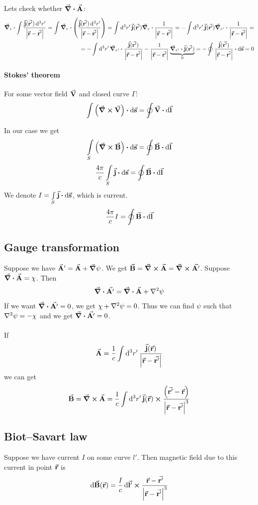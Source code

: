 Lets check whether $\div{\va{A}}$:
\begin{align*}
\grad_r \vdot {\int \frac{\va{j} (\va{r'}) \dd[3]{r'}}{\qty|\va{r} -\va{r'}|}} =  \int \grad_r \vdot \qty(\frac{\va{j} (\va{r'}) \dd[3]{r'}}{\qty|\va{r} -\va{r'}|})  = \int \dd[3]{r'}  \va{j} (\va{r'}) \grad_{r} \vdot \frac{1 }{\qty|\va{r} -\va{r'}|} = -\int \dd[3]{r'}  \va{j} (\va{r'}) \grad_{r'} \vdot \frac{1 }{\qty|\va{r} -\va{r'}|} =\\= -\int \dd[3]{r'}  \grad_{r'} \vdot \frac{\va{j} (\va{r'})  }{\qty|\va{r} -\va{r'}|} - \frac{1 }{\qty|\va{r} -\va{r'}|} \underbrace{\grad_{r'} \vdot \va{j} (\va{r'}) }_{0} = - \oint \frac{\va{j} (\va{r'})  }{\qty|\va{r} -\va{r'}|} \vdot \dd{\va{s}} = 0
\end{align*}
\paragraph{Stokes' theorem}
For some vector field $\va{V}$ and closed curve $\Gamma$:
$$\int \qty(\curl{\va{V}}) \vdot \dd{\va{s}} = \oint \va{V} \vdot \dd{\va{l}}$$

In our case we get
$$\int\limits_{S} \qty(\curl{\va{B}}) \vdot \dd{\va{s}} = \oint \va{B} \vdot \dd{\va{l}}$$
$$\frac{4\pi}{c}\int\limits_{S} \va{j} \vdot \dd{\va{s}} = \oint \va{B} \vdot \dd{\va{l}}$$
We denote $I = \int\limits_{S} \va{j} \vdot \dd{\va{s}}$, which is current.
$$\frac{4\pi}{c}I = \oint \va{B} \vdot \dd{\va{l}}$$
\subsection{Gauge transformation}
Suppose we have $\va{A}' = \va{A} + \grad{\psi}$. We get $\va{B} = \curl{\va{A}} = \curl{\va{A'}}$.
Suppose $\div{\va{A}} = \chi$. Then
$$\div{\va{A'}} = \div{\va{A}} + \laplacian{\psi}$$
If we want $\div{\va{A'}} = 0$, we get $\chi + \laplacian{\psi} = 0$. Thus we can find $\psi$ such that $\laplacian{\psi} = -\chi$ and we get $\div{\va{A'}} = 0$.

\paragraph{}
If 
$$\va{A} = \frac{1}{c} \int \dd[3]{r'} \frac{\va{j}(\va{r})}{\abs{\va{r}-\va{r'}}}$$
we can get
$$\va{B} = \curl{\va{A}} = \frac{1}{c} \int \dd[3]{r'} \va{j}(\va{r}) \cross \frac{\qty(\va{r'}-\va{r})}{\abs{\va{r}-\va{r'}}^3}$$
\subsection{Biot–Savart law}
Suppose we have current $I$ on some curve $l'$. Then magnetic field due to this current in point $\va{r}$ is
$$\dd{\va{B}(\va{r})} = \frac{I}{c} \dd{\va{l'}} \cross \frac{\va{r}-\va{r'}}{\abs{\va{r}-\va{r'}}^3}$$
